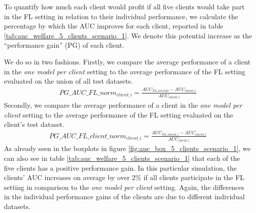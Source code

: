 To quantify how much each client would profit if all five clients would take part in the FL setting in relation to their individual performance, we calculate the percentage by which the AUC improves for each client, reported in table \ref{tab:auc_welfare_5_clients_scenario_1}. We denote this potential increase as the ``performance gain'' (PG) of each client.

We do so in two fashions. Firstly, we compare the average performance of a client in the \emph{one model per client} setting to the average performance of the FL setting evaluated on the union of all test datasets.
\begin{align}
    PG\_AUC\_FL\_norm_{client\_i} = \frac{AUC_{FL\_overall} - AUC_{client\_i}}{AUC_{client\_i}}\label{eq:PG_FL}
\end{align}
Secondly, we compare the average performance of a client in the \emph{one model per client} setting to the average performance of the FL setting evaluated on the client's test dataset. \begin{align}
    PG\_AUC\_FL\_client\_norm_{client\_i} = \frac{AUC_{FL\_client\_i} - AUC_{client\_i}}{AUC_{client\_i}}\label{eq:PG_client_FL}
\end{align}
As already seen in the boxplots in figure \ref{fig:auc_box_5_clients_scenario_1}, we can also see in table \ref{tab:auc_welfare_5_clients_scenario_1} that each of the five clients has a positive performance gain. In this particular simulation, the clients' AUC increases on average by over $2\%$ if all clients participate in the FL setting in comparison to the \emph{one model per client} setting. Again, the differences in the individual performance gains of the clients are due to different individual datasets.

